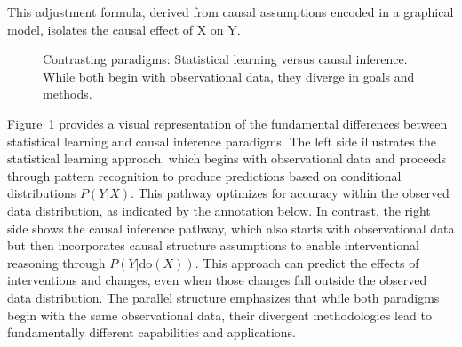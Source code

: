 This adjustment formula, derived from causal assumptions encoded in a graphical model, isolates the causal effect of X on Y.

\begin{figure}[h!]
	\centering
	\caption[Contrasting paradigms: Statistical learning versus causal inference]{Contrasting paradigms: Statistical learning versus causal inference. While both begin with observational data, they diverge in goals and methods.}
	\label{fig:paradigms}
\end{figure}

Figure~\ref{fig:paradigms} provides a visual representation of the fundamental differences between statistical learning and causal inference paradigms. The left side illustrates the statistical learning approach, which begins with observational data and proceeds through pattern recognition to produce predictions based on conditional distributions $P(Y|X)$. This pathway optimizes for accuracy within the observed data distribution, as indicated by the annotation below. In contrast, the right side shows the causal inference pathway, which also starts with observational data but then incorporates causal structure assumptions to enable interventional reasoning through $P(Y|\text{do}(X))$. This approach can predict the effects of interventions and changes, even when those changes fall outside the observed data distribution. The parallel structure emphasizes that while both paradigms begin with the same observational data, their divergent methodologies lead to fundamentally different capabilities and applications.

